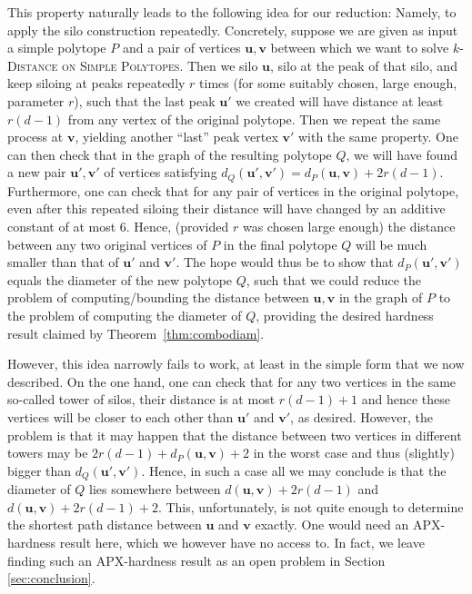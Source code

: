 \documentclass[centering,11pt,reqno]{amsart}
\theoremstyle{definition}
\begin{document}
This property naturally leads to the following idea for our reduction: Namely, to apply the silo construction repeatedly. Concretely, suppose we are given as input a simple polytope $P$ and a pair of vertices $\mathbf{u}, \mathbf{v}$ between which we want to solve \textsc{$k$-Distance on Simple Polytopes}. Then we silo $\mathbf{u}$, silo at the peak of that silo, and keep siloing at peaks repeatedly $r$ times (for some suitably chosen, large enough, parameter $r$), such that the last peak $\mathbf{u}'$ we created will have distance at least $r(d-1)$ from any vertex of the original polytope. Then we repeat the same process at $\mathbf{v}$, yielding another ``last'' peak vertex $\mathbf{v}'$ with the same property. One can then check that in the graph of the resulting polytope $Q$, we will have found a new pair $\mathbf{u}', \mathbf{v}'$ of vertices satisfying $d_Q(\mathbf{u}',\mathbf{v}') = d_P(\mathbf{u},\mathbf{v}) + 2r(d-1)$. Furthermore, one can check that for any pair of vertices in the original polytope, even after this repeated siloing their distance will have changed by an additive constant of at most $6$. Hence, (provided $r$ was chosen large enough) the distance between any two original vertices of $P$ in the final polytope $Q$ will be much smaller than that of $\mathbf{u'}$ and $\mathbf{v}'$. The hope would thus be to show that $d_P(\mathbf{u}', \mathbf{v}')$ equals the diameter of the new polytope $Q$, such that we could reduce the problem of computing/bounding the distance between $\mathbf{u}, \mathbf{v}$ in the graph of $P$ to the problem of computing the diameter of $Q$, providing the desired hardness result claimed by Theorem~\ref{thm:combodiam}. 

However, this idea narrowly fails to work, at least in the simple form that we now described. On the one hand, one can check that for any two vertices in the same so-called tower of silos, their distance is at most $r(d-1) + 1$ and hence these vertices will be closer to each other than $\mathbf{u}'$ and $\mathbf{v}'$, as desired. However, the problem is that it may happen that the distance between two vertices in different towers may be $2r(d-1) + d_P(\mathbf{u}, \mathbf{v}) + 2$ in the worst case and thus (slightly) bigger than $d_Q(\mathbf{u}',\mathbf{v}')$. Hence, in such a case all we may conclude is that the diameter of $Q$ lies somewhere between $d(\mathbf{u},\mathbf{v}) + 2r(d-1)$ and $d(\mathbf{u},\mathbf{v}) + 2r(d-1) + 2$. This, unfortunately, is not quite enough to determine the shortest path distance between $\mathbf{u}$ and $\mathbf{v}$ exactly. One would need an APX-hardness result here, which we however have no access to. In fact, we leave finding such an APX-hardness result as an open problem in Section \ref{sec:conclusion}. 
\end{document}
